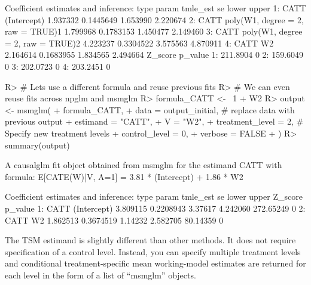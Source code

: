 \documentclass[
]{jss}
\begin{document}
\begin{CodeChunk}
\begin{CodeOutput}
Coefficient estimates and inference:
   type                             param tmle_est        se    lower    upper
1: CATT                       (Intercept) 1.937332 0.1445649 1.653990 2.220674
2: CATT poly(W1, degree = 2, raw = TRUE)1 1.799968 0.1783153 1.450477 2.149460
3: CATT poly(W1, degree = 2, raw = TRUE)2 4.223237 0.3304522 3.575563 4.870911
4: CATT                                W2 2.164614 0.1683955 1.834565 2.494664
    Z_score p_value
1: 211.8904       0
2: 159.6049       0
3: 202.0723       0
4: 203.2451       0
\end{CodeOutput}
\begin{CodeInput}
R> # Lets use a different formula and reuse previous fits
R> # We can even reuse fits across npglm and msmglm
R> formula_CATT <- ~1 + W2  
R> output <- msmglm(
+       formula_CATT, 
+       data = output_initial, # replace data with previous output
+       estimand = "CATT", 
+       V = "W2",
+       treatment_level = 2,  # Specify new treatment levels
+       control_level = 0,
+       verbose = FALSE
+       )
R> summary(output)
\end{CodeInput}
\begin{CodeOutput}
A causalglm fit object obtained from msmglm for the estimand CATT with formula: 
E[CATE(W)|V, A=1] = 3.81 * (Intercept) + 1.86 * W2

Coefficient estimates and inference:
   type       param tmle_est        se   lower    upper   Z_score p_value
1: CATT (Intercept) 3.809115 0.2208943 3.37617 4.242060 272.65249       0
2: CATT          W2 1.862513 0.3674519 1.14232 2.582705  80.14359       0
\end{CodeOutput}
\end{CodeChunk}

The TSM estimand is slightly different than other methods. It does not
require specification of a control level. Instead, you can specify
multiple treatment levels and conditional treatment-specific mean
working-model estimates are returned for each level in the form of a
list of ``msmglm'' objects.
\end{document}
